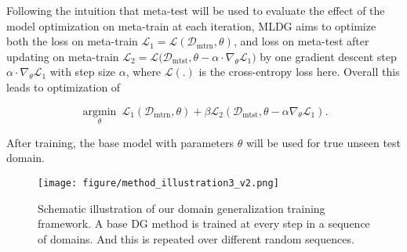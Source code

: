 \documentclass[runningheads]{llncs}
\begin{document}
Following the intuition that meta-test will be used to evaluate the effect of the model optimization on meta-train at each iteration, MLDG aims to optimize both the loss on meta-train  $\mathcal{L}_{1}= \mathcal{L}(\mathcal{D}_{\text{mtrn}}, \theta)$, and loss on meta-test after updating on meta-train $\mathcal{L}_{2}=\mathcal{L}(\mathcal{D}_{\text{mtst}}, \theta - \alpha \cdot{\nabla_{\theta}\mathcal{L}_{1})}$ by one gradient descent step  $\alpha \cdot \nabla_{\theta}\mathcal{L}_{1}$ with step size $\alpha$, where $\mathcal{L}(.)$ is the cross-entropy loss here. Overall this leads to optimization of

\small
\begin{equation}
\label{eq-mldg}
\underset{\theta}{\operatorname{argmin}}~\mathcal{L}_1(\mathcal{D}_{\text{mtrn}}, \theta) + \beta\mathcal{L}_2(\mathcal{D}_{\text{mtst}}, \theta - \alpha \nabla_\theta\mathcal{L}_1).
\end{equation}
\normalsize

\noindent After training, the base model with parameters $\theta$ will be used for true unseen test domain.



\begin{figure}[t]
\centering
\texttt{[image: figure/method\_illustration3\_v2.png]}
\caption{Schematic illustration of our domain generalization training framework. A base DG method is trained at every step in a sequence of domains. And this is repeated over different random sequences.}
\label{fig:method-illustration}
\end{figure}
\end{document}
